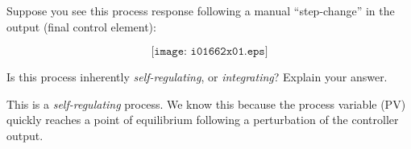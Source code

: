 

Suppose you see this process response following a manual ``step-change'' in the output (final control element):

$$\texttt{[image: i01662x01.eps]}$$

Is this process inherently {\it self-regulating}, or {\it integrating}?  Explain your answer.







This is a {\it self-regulating} process.  We know this because the process variable (PV) quickly reaches a point of equilibrium following a perturbation of the controller output.












